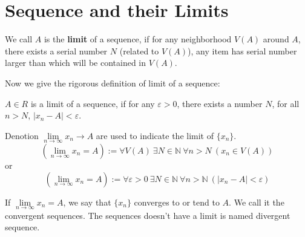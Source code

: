 \section{Sequence and their Limits}
\begin{definition}
    We call $A$ is the \textbf{limit} of a sequence, if for any neighborhood $V(A)$ around $A$, there exists a serial number $N$ (related to $V(A)$), any item has serial number larger than which will be contained in $V(A)$.
\end{definition}
Now we give the rigorous definition of limit of a sequence:\

\begin{definition}
    $A\in R$ is a limit of a sequence, if for any $\varepsilon >0$, there exists a number $N$, for all $n>N$, $\left\lvert x_{n}-A\right\lvert<\varepsilon$.    
\end{definition}

Denotion $\lim\limits_{n \to \infty}x_{n}\to A$ are used to indicate the limit of $\{x_{n}\}$.
\[\left(\lim\limits_{n \to \infty}x_{n}=A\right):=\forall V(A)\ \exists N\in \mathbb{N}\ \forall n>N\ (x_{n}\in V(A)) \]
or
\[\left(\lim\limits_{n \to \infty}x_{n}=A\right):=\forall \varepsilon>0\ \exists N\in \mathbb{N}\ \forall n>\mathbb{N}\ (\left| x_{n}-A \right|<\varepsilon )\]

\begin{definition}
    If $\lim\limits_{n \to \infty}x_{n}=A$, we say that $\{x_{n}\}$ converges to or tend to $A$. We call it the convergent sequences. The sequences doesn't have a limit is named divergent sequence.
\end{definition}
